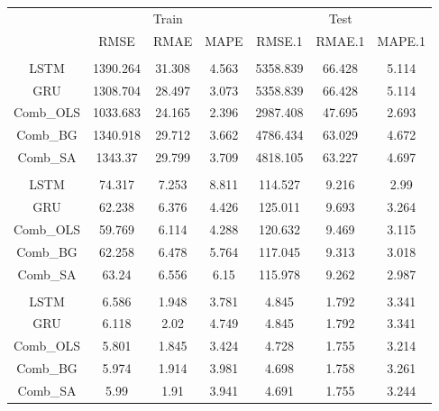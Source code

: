 \documentclass[
]{article}
\begin{document}
\begin{tabular}[t]{ccccccc}
\toprule
\multicolumn{1}{c}{ } & \multicolumn{3}{c}{Train} & \multicolumn{3}{c}{Test} \\
\cmidrule(l{3pt}r{3pt}){2-4} \cmidrule(l{3pt}r{3pt}){5-7}
 & RMSE & RMAE & MAPE & RMSE.1 & RMAE.1 & MAPE.1\\
\midrule
\addlinespace[0.3em]
\multicolumn{7}{l}{\textbf{BTC}}\\
\hspace{1em}LSTM & 1390.264 & 31.308 & 4.563 & 5358.839 & 66.428 & 5.114\\
\hspace{1em}GRU & 1308.704 & 28.497 & 3.073 & 5358.839 & 66.428 & 5.114\\
\hspace{1em}Comb\_OLS & 1033.683 & 24.165 & 2.396 & 2987.408 & 47.695 & 2.693\\
\hspace{1em}Comb\_BG & 1340.918 & 29.712 & 3.662 & 4786.434 & 63.029 & 4.672\\
\hspace{1em}Comb\_SA & 1343.37 & 29.799 & 3.709 & 4818.105 & 63.227 & 4.697\\
\addlinespace[0.3em]
\multicolumn{7}{l}{\textbf{ETH}}\\
\hspace{1em}LSTM & 74.317 & 7.253 & 8.811 & 114.527 & 9.216 & 2.99\\
\hspace{1em}GRU & 62.238 & 6.376 & 4.426 & 125.011 & 9.693 & 3.264\\
\hspace{1em}Comb\_OLS & 59.769 & 6.114 & 4.288 & 120.632 & 9.469 & 3.115\\
\hspace{1em}Comb\_BG & 62.258 & 6.478 & 5.764 & 117.045 & 9.313 & 3.018\\
\hspace{1em}Comb\_SA & 63.24 & 6.556 & 6.15 & 115.978 & 9.262 & 2.987\\
\addlinespace[0.3em]
\multicolumn{7}{l}{\textbf{LTC}}\\
\hspace{1em}LSTM & 6.586 & 1.948 & 3.781 & 4.845 & 1.792 & 3.341\\
\hspace{1em}GRU & 6.118 & 2.02 & 4.749 & 4.845 & 1.792 & 3.341\\
\hspace{1em}Comb\_OLS & 5.801 & 1.845 & 3.424 & 4.728 & 1.755 & 3.214\\
\hspace{1em}Comb\_BG & 5.974 & 1.914 & 3.981 & 4.698 & 1.758 & 3.261\\
\hspace{1em}Comb\_SA & 5.99 & 1.91 & 3.941 & 4.691 & 1.755 & 3.244\\
\bottomrule
\end{tabular}
\end{document}
